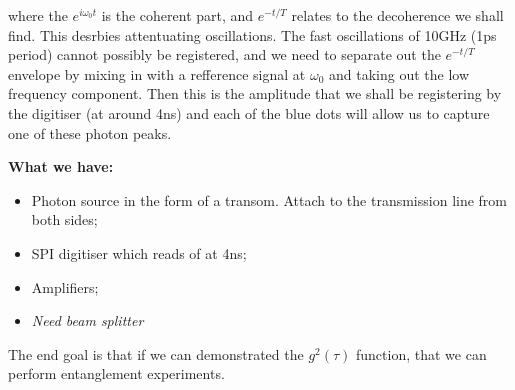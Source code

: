 \begin{enumerate}
	\noindent where the $ 	e^{i\omega_0 t} $ is the coherent part, and  $ e^{-t/T} $ relates to the decoherence we shall find. This desrbies attentuating oscillations. The fast oscillations of 10GHz (1ps period) cannot possibly be registered, and we need to separate out the $ e^{-t/T} $ envelope by mixing in with a refference signal at $ \omega_0 $ and taking out the low frequency component.  Then this is the amplitude that we shall be registering by the digitiser (at around 4ns) and each of the blue dots will allow us to capture one of these photon peaks.
	
	
	
	\textbf{What we have:}
	\begin{itemize}
		\item Photon source in the form of a transom. Attach to the transmission line from both sides;
		\item SPI digitiser which reads of at 4ns;
		\item Amplifiers;
		\item \textit{Need beam splitter}
	\end{itemize}
	
	The end goal is that if we can demonstrated the $ g^2(\tau) $ function, that we can perform entanglement experiments.
\end{enumerate}

\newpage 
